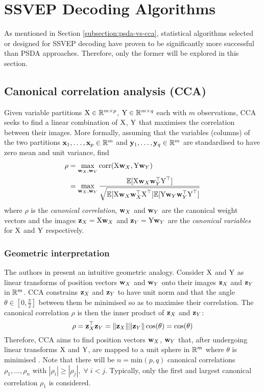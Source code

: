 \section{SSVEP Decoding Algorithms}
As mentioned in Section \ref{subsection:psda-vs-cca}, statistical algorithms selected or designed for SSVEP decoding have proven to be significantly more successful than PSDA approaches. Therefore, only the former will be explored in this section.

\subsection{Canonical correlation analysis (CCA)}
\label{section:cca-c3}
Given variable partitions ${\textrm{X}} \in \mathbb{R}^{m\times p}$, ${\textrm{Y}} \in \mathbb{R}^{m\times q}$ each with $m$ observations, CCA seeks to find a linear combination of ${\textrm{X}}$, ${\textrm{Y}}$ that maximises the correlation between their images. More formally, assuming that the variables (columns) of the two partitions ${\mathbf{x}}_1, \dots, {\mathbf{x}}_p \in \mathbb{R}^{m}$ and ${\mathbf{y}}_1, \dots, {\mathbf{y}}_q \in \mathbb{R}^{m}$ are standardised to have zero mean and unit variance, find
\begin{align}
    \rho &= \max_{{\mathbf{w}}_X, {\mathbf{w}}_Y} \textrm{corr}({\textrm{X}} {\mathbf{w}}_X, {\textrm{Y}} {\mathbf{w}}_Y) \\
    &= \max_{{\mathbf{w}}_X, {\mathbf{w}}_Y} \frac{{\mathbb{E}}[{\textrm{X}} {\mathbf{w}}_X{\mathbf{w}}_Y^\top{\textrm{Y}}^\top ]}{\sqrt{{\mathbb{E}}[{\textrm{X}} {\mathbf{w}}_X{\mathbf{w}}_X^\top{\textrm{X}}^\top]{\mathbb{E}}[{\textrm{Y}} {\mathbf{w}}_Y{\mathbf{w}}_Y^\top{\textrm{Y}}^\top]}}
    \label{eq:cca-corr-objective}
\end{align}
where $\rho$ is the \textit{canonical correlation}, ${\mathbf{w}}_X$ and ${\mathbf{w}}_Y$ are the canonical weight vectors and the images ${\mathbf{z}}_X = {\textrm{X}}{\mathbf{w}}_X$ and ${\mathbf{z}}_Y = {\textrm{Y}}{\mathbf{w}}_Y$ are the \textit{canonical variables} for ${\textrm{X}}$ and ${\textrm{Y}}$ respectively.

\subsubsection{Geometric interpretation}
The authors in \cite{cca-tutorial} present an intuitive geometric analogy. Consider ${\textrm{X}}$ and ${\textrm{Y}}$ as linear transforms of position vectors ${\mathbf{w}}_X$ and ${\mathbf{w}}_Y$ onto their images ${\mathbf{z}}_X$ and ${\mathbf{z}}_Y$ in $\mathbb{R}^m$. CCA constrains ${\mathbf{z}}_X$ and ${\mathbf{z}}_Y$ to have unit norm and that the angle $\theta \in [0, \frac{\pi}{2}]$ between them be minimised so as to maximise their correlation. The canonical correlation $\rho$ is then the inner product of ${\mathbf{z}}_X$ and ${\mathbf{z}}_Y$:
\begin{equation}
    \rho = {\mathbf{z}}_X^\top{\mathbf{z}}_Y = \|{\mathbf{z}}_X\| \|{\mathbf{z}}_Y\|\cos(\theta) = \cos(\theta)
\end{equation}
Therefore, CCA aims to find position vectors ${\mathbf{w}}_X$, ${\mathbf{w}}_Y$ that, after undergoing linear transforms ${\textrm{X}}$ and ${\textrm{Y}}$, are mapped to a unit sphere in $\mathbb{R}^m$ where $\theta$ is minimised \cite{cca-tutorial}. Note that there will be $n=\textrm{min}(p, q)$ canonical correlations $\rho_1, \dots, \rho_n$ with $|\rho_i| \geq |\rho_j|, \; \forall \; i < j$. Typically, only the first and largest canonical correlation $\rho_1$ is considered. 

